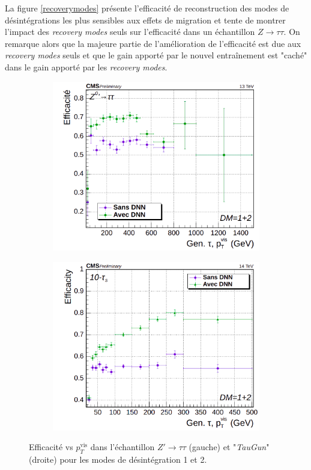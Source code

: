 La figure \ref{recoverymodes} présente l'efficacité de reconstruction des modes de désintégrations les plus sensibles aux effets de migration et tente de montrer l'impact des \textit{recovery modes} seuls sur l'efficacité dans un échantillon $Z\to\tau\tau$. On remarque alors que la majeure partie de l'amélioration de l'efficacité est due aux \textit{recovery modes} seuls et que le gain apporté par le nouvel entraînement est "caché" dans le gain apporté par les \textit{recovery modes}.

\begin{figure}
  \begin{subfigure}{0.5\linewidth}
    \centering
    \includegraphics[width=\linewidth]{Chapitre4/Images/HPSnewDM12s_zptt_pt.png} 
  \end{subfigure}
  \begin{subfigure}{0.5\linewidth}
    \centering
    \includegraphics[width=\linewidth]{Chapitre4/Images/HPSnewDM12s_10t_pt.png} 
  \end{subfigure} 
  \caption{Efficacité vs $p_T^{\text{vis}}$ dans l'échantillon $Z'\rightarrow\tau\tau$ (gauche) et "\textit{TauGun}" (droite) pour les modes de désintégration 1 et 2.}
  \label{DM12}
\end{figure}

